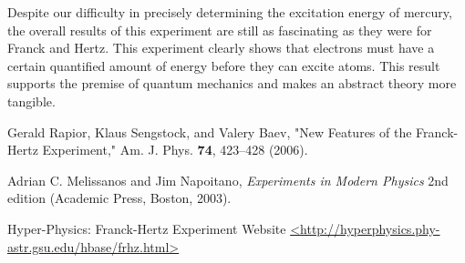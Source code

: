 \documentclass[prb,preprint]{revtex4-1}
\begin{document}
Despite our difficulty in precisely determining the excitation energy of mercury, the overall results of this experiment are still as fascinating as they were for Franck and Hertz. This experiment clearly shows that electrons must have a certain quantified amount of energy before they can excite atoms. This result supports the premise of quantum mechanics and makes an abstract theory more tangible.

\begin{thebibliography}{9}


 Gerald Rapior, Klaus Sengstock, and Valery Baev, "New Features of the Franck-Hertz Experiment,"  Am. J. Phys. \textbf{74}, 423--428 (2006). 

 Adrian C. Melissanos and Jim Napoitano, \textit{Experiments in Modern Physics} 2nd edition (Academic Press, Boston, 2003).

 Hyper-Physics: Franck-Hertz Experiment Website \url{<http://hyperphysics.phy-astr.gsu.edu/hbase/frhz.html>}

\end{thebibliography}
\end{document}
